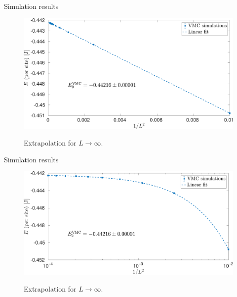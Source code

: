 \documentclass[10pt, compress, protectframetitle, handout]{beamer}
\begin{document}
\begin{frame}{Simulation results}

	\begin{figure}
		\centering
		\includegraphics[width=\textwidth]{E_VMC}
		\label{fig:E_VMC}
		\caption{Extrapolation for $L \to \infty$.}
	\end{figure}
	
\end{frame}

\begin{frame}{Simulation results}

	\begin{figure}
		\centering
		\includegraphics[width=\textwidth]{E_VMC_log}
		\label{fig:E_VMC_log}
		\caption{Extrapolation for $L \to \infty$.}
	\end{figure}
	
\end{frame}
\end{document}
